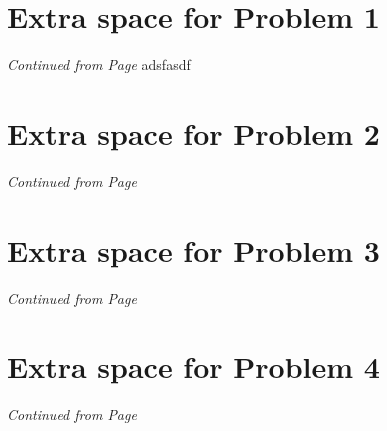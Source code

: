 \documentclass[11pt]{article}
\begin{document}
\begin{itemize}
\newpage

% 
% 
% 
% 
% 
% 

\section*{Extra space for Problem 1}
\emph{Continued from Page \pageref{pg:end-of-p1}}
adsfasdf
\label{pg:p1-continuation}



\newpage


\section*{Extra space for Problem 2}
\emph{Continued from Page \pageref{pg:end-of-p2}}


\label{pg:p2-continuation}
\newpage

\section*{Extra space for Problem 3}
\emph{Continued from Page \pageref{pg:end-of-p3}}


\label{pg:p3-continuation}
\newpage



\section*{Extra space for Problem 4}
\emph{Continued from Page \pageref{pg:end-of-p4}}



\end{itemize}
\end{document}
